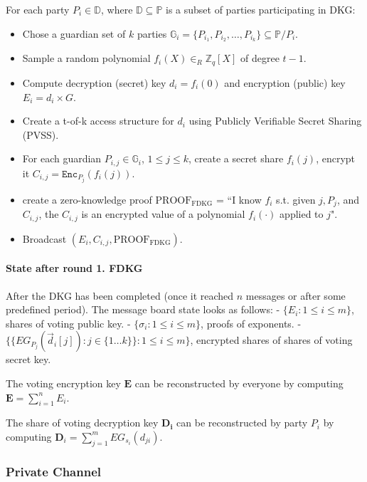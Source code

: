 \documentclass{article}
\begin{document}
For each party $P_i \in \mathbb{D}$, where $\mathbb{D} \subseteq  \mathbb{P}$ is a subset of parties participating in DKG:
\begin{itemize}
    \item Chose a guardian set of $k$ parties  $\mathbb{G}_i=\{P_{i_1},P_{i_2},\dots,P_{i_k}\}\subseteq \mathbb{P}/P_i$.
    \item Sample a random polynomial $f_{i}(X) \in_R \mathbb{Z}_q[X]$ of degree $t-1$.
    \item Compute decryption (secret) key $d_{i}= f_i(0)$ and encryption (public) key $E_{i} = d_i \times G$.
    \item Create a t-of-k access structure for $d_i$ using Publicly Verifiable Secret Sharing (PVSS).
    \item For each guardian $P_{i,j} \in \mathbb{G}_i$, $1 \leq j \leq k$, create a secret share $f_i(j)$, encrypt it $C_{i,j}=\texttt{Enc}_{P_j}(f_i(j))$.
    
    \item create a zero-knowledge proof $\textrm{PROOF}_\textrm{FDKG}$ = “I know $f_i$ s.t. given $j, P_j$, and $C_{i,j}$, the $C_{i,j}$ is an encrypted value of a polynomial $f_i(\cdot)$ applied to $j$".
    \item Broadcast $(E_i,C_{i,j}, \textrm{PROOF}_\textrm{FDKG})$.
\end{itemize}

\paragraph*{State after round 1. FDKG}

After the DKG has been completed (once it reached $n$ messages or after some predefined period). The message board state looks as follows:
- $\{E_{i} : 1 \leq i \leq m\}$, shares of voting public key.
- $\{\sigma_{i} : 1 \leq i \leq m\}$, proofs of exponents.
- $\{\{EG_{P_{j}}(\vec{d}_{i}[j]) : j \in \{1\dots k\}\} : 1 \leq i \leq m \}$, encrypted shares of shares of voting secret key.

The voting encryption key $\textbf{E}$ can be reconstructed by everyone by computing $\mathbf{E}=\sum_{i=1}^{n} E_{i}$.

The share of voting decryption key $\mathbf{D_i}$ can be reconstructed by party $P_i$ by computing $\mathbf{D}_{i}=\sum_{j=1}^{m} EG_{s_{i}}(d_{ji})$.



\subsubsection{Private Channel}
\end{document}
